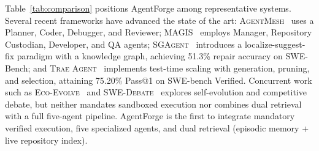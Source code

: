 Table~\ref{tab:comparison} positions AgentForge among representative systems. Several recent frameworks have advanced the state of the art: \textsc{AgentMesh}~\cite{khanzadeh2025agentmesh} uses a Planner, Coder, Debugger, and Reviewer; \textsc{MAGIS}~\cite{tao2024magis} employs Manager, Repository Custodian, Developer, and QA agents; \textsc{SGAgent}~\cite{z} introduces a localize-suggest-fix paradigm with a knowledge graph, achieving 51.3\% repair accuracy on SWE-Bench; and \textsc{Trae Agent}~\cite{trae2025} implements test-time scaling with generation, pruning, and selection, attaining 75.20\% Pass@1 on SWE-bench Verified. Concurrent work such as \textsc{Eco-Evolve}~\cite{ecoevolve2026} and \textsc{SWE-Debate}~\cite{swedebate2026} explores self-evolution and competitive debate, but neither mandates sandboxed execution nor combines dual retrieval with a full five-agent pipeline. AgentForge is the first to integrate mandatory verified execution, five specialized agents, and dual retrieval (episodic memory + live repository index).





